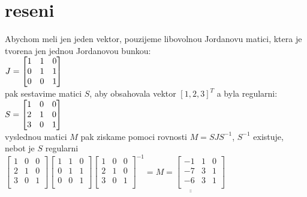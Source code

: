 \documentclass[a4paper]{article}
\def\doubleunderline#1{\underline{\underline{#1}}}
\begin{document}
\section*{reseni}
Abychom meli jen jeden vektor, pouzijeme libovolnou Jordanovu matici,
ktera je tvorena jen jednou Jordanovou bunkou:\\
$J=
\begin{bmatrix}
	1 & 1 & 0\\
	0 & 1 & 1\\
	0 & 0 & 1\\
\end{bmatrix}\\
$\\
pak sestavime matici $S$, aby obsahovala vektor $[1,2,3]^T$ a
byla regularni:\\
$S=
\begin{bmatrix}
	1 & 0 & 0\\
	2 & 1 & 0\\
	3 & 0 & 1\\
\end{bmatrix}\\
$\\
vyslednou matici $M$ pak ziskame pomoci rovnosti $M=SJS^{-1}$,
$S^{-1}$ existuje, nebot je $S$ regularni\\
$
\begin{bmatrix}
	1 & 0 & 0\\
	2 & 1 & 0\\
	3 & 0 & 1\\
\end{bmatrix}
\begin{bmatrix}
	1 & 1 & 0\\
	0 & 1 & 1\\
	0 & 0 & 1\\
\end{bmatrix}
\begin{bmatrix}
	1 & 0 & 0\\
	2 & 1 & 0\\
	3 & 0 & 1\\
\end{bmatrix}^{-1}
= \doubleunderline{ M =
\begin{bmatrix}
	-1 & 1 & 0\\
	-7 & 3 & 1\\
	-6 & 3 & 1\\
\end{bmatrix}
}
$
\end{document}
